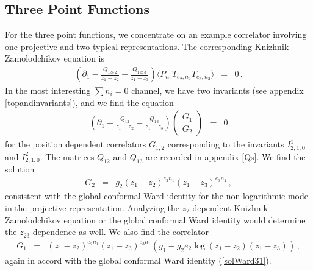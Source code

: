 \documentclass[12pt]{article}
\numberwithin{equation}{section}
\numberwithin{equation}{section}
\numberwithin{table}{section}\setlength{\multlinegap}{25pt}
\begin{document}
\subsection{Three Point Functions}
For the three point functions, we concentrate on an example correlator involving one
projective and two typical representations. The corresponding  Knizhnik-Zamolodchikov equation is
\begin{eqnarray}
(\partial_1 - \frac{Q_{1 \otimes 2}}{z_1-z_2}- \frac{Q_{1 \otimes 3}}{z_1-z_3}) \langle P_{n_1} T_{e_2,n_2} T_{e_3,n_3} \rangle &=& 0 \, .
\end{eqnarray}
In the most interesting $\sum n_i =0$ channel, 
we have two invariants (see appendix \ref{topandinvariants}), and we find the equation
\begin{eqnarray}
(\partial_1 - \frac{Q_{12}}{z_1-z_2}- \frac{Q_{13}}{z_1-z_3}) \left( \begin{array}{c} G_1 \\ G_2 \end{array} \right) &=& 0
\end{eqnarray}
for the position dependent correlators $G_{1,2}$ corresponding to the invariants $I^{1}_{2,1,0}$ and $I^2_{2,1,0}$.
The matrices $Q_{12}$ and $Q_{13}$ are recorded in appendix \ref{Qs}.
We find the solution
\begin{eqnarray}
G_2 &=& g_2 (z_1 - z_2)^{e_2 n_1}(z_1 - z_3)^{ e_3 n_1} \, ,
\end{eqnarray}
consistent with the global conformal Ward identity for the non-logarithmic mode in the projective representation.
Analyzing the $z_2$ dependent Knizhnik-Zamolodchikov equation or the global conformal Ward identity would
determine the $z_{23}$ dependence as well.
We also find the correlator
\begin{eqnarray}
G_1 &=& (z_1 - z_2)^{e_2 n_1}(z_1 - z_3)^{e_3 n_1} (g_1 - g_2 e_2  \log(z_1-z_2)(z_1-z_3)) \, , \nonumber 
\end{eqnarray}
again in accord with the global conformal Ward identity (\ref{solWard31}).
\end{document}
